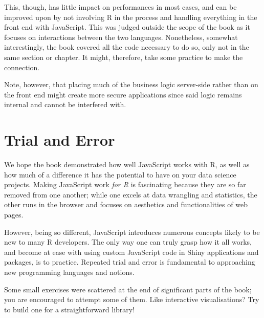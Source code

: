 \documentclass[10pt,]{krantz}
\makeatletter
\newenvironment{Shaded}{\begin{snugshade}}{\end{snugshade}}
\newcommand{\AttributeTok}[1]{\textcolor[rgb]{0.61,0.61,0.61}{#1}}
\newcommand{\CommentTok}[1]{\textcolor[rgb]{0.37,0.37,0.37}{\textit{#1}}}
\newcommand{\KeywordTok}[1]{\textcolor[rgb]{0.27,0.27,0.27}{\textbf{#1}}}
\newcommand{\NormalTok}[1]{#1}
\newcommand{\OperatorTok}[1]{\textcolor[rgb]{0.43,0.43,0.43}{\textbf{#1}}}
\newcommand{\StringTok}[1]{\textcolor[rgb]{0.5,0.5,0.5}{#1}}
\newenvironment{kframe}{%
\medskip{}
\setlength{\fboxsep}{.8em}
 \def\at@end@of@kframe{}%
 \ifinner\ifhmode%
  \def\at@end@of@kframe{\end{minipage}}%
  \begin{minipage}{\columnwidth}%
 \fi\fi%
 \def\FrameCommand##1{\hskip\@totalleftmargin \hskip-\fboxsep
 \colorbox{shadecolor}{##1}\hskip-\fboxsep
     \hskip-\linewidth \hskip-\@totalleftmargin \hskip\columnwidth}%
 \MakeFramed {\advance\hsize-\width
   \@totalleftmargin\z@ \linewidth\hsize
   \@setminipage}}%
 {\par\unskip\endMakeFramed%
 \at@end@of@kframe}
\renewenvironment{Shaded}{\begin{kframe}}{\end{kframe}}
\makeatother
\begin{document}
This, though, has little impact on performances in most cases, and can be improved upon by not involving R in the process and handling everything in the front end with JavaScript. This was judged outside the scope of the book as it focuses on interactions between the two languages. Nonetheless, somewhat interestingly, the book covered all the code necessary to do so, only not in the same section or chapter. It might, therefore, take some practice to make the connection.

\begin{Shaded}
\end{Shaded}

Note, however, that placing much of the business logic server-side rather than on the front end might create more secure applications since said logic remains internal and cannot be interfered with.

\hypertarget{conclusion-trial-and-error}{%
\section{Trial and Error}\label{conclusion-trial-and-error}}

We hope the book demonstrated how well JavaScript works with R, as well as how much of a difference it has the potential to have on your data science projects. Making JavaScript work \emph{for R} is fascinating because they are so far removed from one another; while one excels at data wrangling and statistics, the other runs in the browser and focuses on aesthetics and functionalities of web pages.

However, being so different, JavaScript introduces numerous concepts likely to be new to many R developers. The only way one can truly grasp how it all works, and become at ease with using custom JavaScript code in Shiny applications and packages, is to practice. Repeated trial and error is fundamental to approaching new programming languages and notions.

Some small exercises were scattered at the end of significant parts of the book; you are encouraged to attempt some of them. Like interactive visualisations? Try to build one for a straightforward library!
\end{document}
